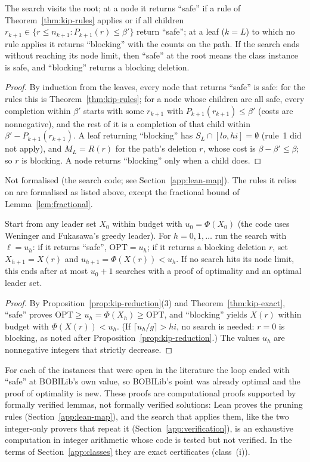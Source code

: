 \begin{theorem}[Exactness]\label{thm:kip-exact}
The search visits the root; at a node it returns ``safe'' if a rule of
Theorem~\ref{thm:kip-rules} applies or if all children
$r_{k+1}\in\{r\le n_{k+1}:P_{k+1}(r)\le\beta'\}$ return ``safe''; at a leaf
($k=L$) to which no rule applies it returns ``blocking'' with the counts on
the path. If the search ends without reaching its node limit, then ``safe''
at the root means the class instance is safe, and ``blocking'' returns a
blocking deletion.
\end{theorem}
\begin{proof}
By induction from the leaves, every node that returns ``safe'' is safe: for
the rules this is Theorem~\ref{thm:kip-rules}; for a node whose children are
all safe, every completion within $\beta'$ starts with some $r_{k+1}$ with
$P_{k+1}(r_{k+1})\le\beta'$ (costs are nonnegative), and the rest of it is a
completion of that child within $\beta'-P_{k+1}(r_{k+1})$. A leaf returning
``blocking'' has $S_L\cap[lo,hi]=\emptyset$ (rule~1 did not apply), and $M_L=R(r)$
for the path's deletion $r$, whose cost is $\beta-\beta'\le\beta$; so $r$ is
blocking. A node returns ``blocking'' only when a child does.
\end{proof}
\noindent Not formalised (the search code; see Section~\ref{app:lean-map}).
The rules it relies on are formalised as listed above, except the fractional
bound of Lemma~\ref{lem:fractional}.

\begin{corollary}\label{cor:kip-loop}
Start from any leader set $X_0$ within budget with $u_0=\Phi(X_0)$ (the code
uses Weninger and Fukasawa's greedy leader). For $h=0,1,\dots$ run the search
with $\ell=u_h$: if it returns ``safe'', $\mathrm{OPT}=u_h$; if it returns a
blocking deletion $r$, set $X_{h+1}=X(r)$ and $u_{h+1}=\Phi(X(r))<u_h$. If no
search hits its node limit, this ends after at most $u_0+1$ searches with a
proof of optimality and an optimal leader set.
\end{corollary}
\begin{proof}
By Proposition~\ref{prop:kip-reduction}(3) and Theorem~\ref{thm:kip-exact},
``safe'' proves $\mathrm{OPT}\ge u_h=\Phi(X_h)\ge\mathrm{OPT}$, and ``blocking''
yields $X(r)$ within budget with $\Phi(X(r))<u_h$. (If
$\lceil u_h/g\rceil>hi$, no search is needed: $r=0$ is blocking, as noted
after Proposition~\ref{prop:kip-reduction}.) The values $u_h$ are
nonnegative integers that strictly decrease.
\end{proof}

For each of the \NumNewKip{} instances that were open in the literature the loop ended
with ``safe'' at BOBILib's own value, so BOBILib's point was already optimal
and the proof of optimality is new. These proofs are computational proofs
supported by formally verified lemmas, not formally verified solutions: Lean
proves the pruning rules (Section~\ref{app:lean-map}), and the search that
applies them, like the two integer-only provers that repeat it
(Section~\ref{app:verification}), is an exhaustive computation in integer
arithmetic whose code is tested but not verified. In the terms of
Section~\ref{app:classes} they are exact certificates (class~(i)).

